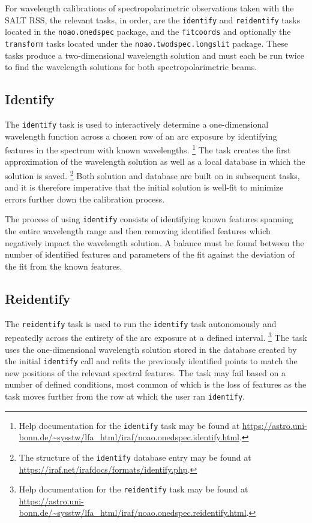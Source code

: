 For wavelength calibrations of spectropolarimetric observations taken with the \gls{SALT} \gls{RSS}, the relevant tasks, in order, are the \texttt{identify} and \texttt{reidentify} tasks located in the \texttt{noao.onedspec} package, and the \texttt{fitcoords} and optionally the \texttt{transform} tasks located under the \texttt{noao.twodspec.longslit} package. These tasks produce a two-dimensional wavelength solution and must each be run twice to find the wavelength solutions for both spectropolarimetric beams.

\subsection{Identify}

The \texttt{identify} task is used to interactively determine a one-dimensional wavelength function across a chosen row of an arc exposure by identifying features in the spectrum with known wavelengths.%
\footnote{Help documentation for the \texttt{identify} task may be found at \url{https://astro.uni-bonn.de/~sysstw/lfa_html/iraf/noao.onedspec.identify.html}.}
The task creates the first approximation of the wavelength solution as well as a local database in which the solution is saved.%
\footnote{The structure of the \texttt{identify} database entry may be found at \url{https://iraf.net/irafdocs/formats/identify.php}.}
Both solution and database are built on in subsequent tasks, and it is therefore imperative that the initial solution is well-fit to minimize errors further down the calibration process.

The process of using \texttt{identify} consists of identifying known features spanning the entire wavelength range and then removing identified features which negatively impact the wavelength solution. A balance must be found between the number of identified features and parameters of the fit against the deviation of the fit from the known features.%

\subsection{Reidentify}

The \texttt{reidentify} task is used to run the \texttt{identify} task autonomously and repeatedly across the entirety of the arc exposure at a defined interval.%
\footnote{Help documentation for the \texttt{reidentify} task may be found at \url{https://astro.uni-bonn.de/~sysstw/lfa_html/iraf/noao.onedspec.reidentify.html}.}
The task uses the one-dimensional wavelength solution stored in the database created by the initial \texttt{identify} call and refits the previously identified points to match the new positions of the relevant spectral features. The task may fail based on a number of defined conditions, most common of which is the loss of features as the task moves further from the row at which the user ran \texttt{identify}.


